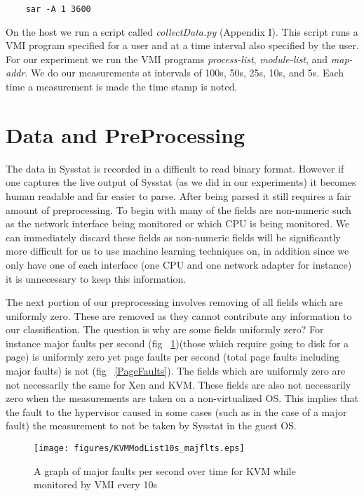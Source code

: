 \begin{center}\label{SAR}
\begin{verbatim}
	sar -A 1 3600
\end{verbatim}
\end{center}

On the host we run a script called \textit{collectData.py} (Appendix I). This script runs a VMI program specified for a user and at a time interval also specified by the user. For our experiment we run the VMI programs \textit{process-list}, \textit{module-list}, and \textit{map-addr}. We do our measurements at intervals of 100s, 50s, 25s, 10s, and 5s. Each time a measurement is made the time stamp is noted.

\section{Data and PreProcessing}
The data in Sysstat is recorded in a difficult to read binary format. However if one captures the live output of Sysstat (as we did in our experiments) it becomes human readable and far easier to parse. After being parsed it still requires a fair amount of preprocessing. To begin with many of the fields are non-numeric such as the network interface being monitored or which CPU is being monitored. We can immediately discard these fields as non-numeric fields will be significantly more difficult for us to use machine learning techniques on, in addition since we only have one of each interface (one CPU and one network adapter for instance) it is unnecessary to keep this information. 

The next portion of our preprocessing involves removing of all fields which are uniformly zero. These are removed as they cannot contribute any information to our classification. The question is why are some fields uniformly zero? For instance major faults per second (fig ~\ref{MajorFaults})(those which require going to disk for a page) is uniformly zero yet page faults per second (total page faults including major faults) is not (fig ~\ref{PageFaults}). The fields which are uniformly zero are not necessarily the same for Xen and KVM. These fields are also not necessarily zero when the measurements are taken on a non-virtualized OS. This implies that the fault to the hypervisor caused in some cases (such as in the case of a major fault) the measurement to not be taken by Sysstat in the guest OS. 


\begin{figure}
	  \centering
	  \texttt{[image: figures/KVMModList10s\_majflts.eps]}
	  \caption{A graph of major faults per second over time for KVM while monitored by VMI every 10s}
	  \label{MajorFaults}
\end{figure}

